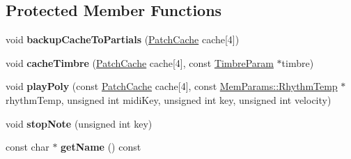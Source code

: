 \subsection*{Protected Member Functions}
\begin{DoxyCompactItemize}
\item 
\hypertarget{classMT32Emu_1_1Part_a05640c2c188b9513972c9a4625a33057}{void {\bfseries backup\-Cache\-To\-Partials} (\hyperlink{structMT32Emu_1_1PatchCache}{Patch\-Cache} cache\mbox{[}4\mbox{]})}\label{classMT32Emu_1_1Part_a05640c2c188b9513972c9a4625a33057}

\item 
\hypertarget{classMT32Emu_1_1Part_a021cac28939327fdc9042268dd457ecb}{void {\bfseries cache\-Timbre} (\hyperlink{structMT32Emu_1_1PatchCache}{Patch\-Cache} cache\mbox{[}4\mbox{]}, const \hyperlink{structMT32Emu_1_1TimbreParam}{Timbre\-Param} $\ast$timbre)}\label{classMT32Emu_1_1Part_a021cac28939327fdc9042268dd457ecb}

\item 
\hypertarget{classMT32Emu_1_1Part_a82799d0b4098649ad260f7a40a517cf3}{void {\bfseries play\-Poly} (const \hyperlink{structMT32Emu_1_1PatchCache}{Patch\-Cache} cache\mbox{[}4\mbox{]}, const \hyperlink{structMT32Emu_1_1MemParams_1_1RhythmTemp}{Mem\-Params\-::\-Rhythm\-Temp} $\ast$rhythm\-Temp, unsigned int midi\-Key, unsigned int key, unsigned int velocity)}\label{classMT32Emu_1_1Part_a82799d0b4098649ad260f7a40a517cf3}

\item 
\hypertarget{classMT32Emu_1_1Part_ade360ad50edafb4371ac983ed5b3865a}{void {\bfseries stop\-Note} (unsigned int key)}\label{classMT32Emu_1_1Part_ade360ad50edafb4371ac983ed5b3865a}

\item 
\hypertarget{classMT32Emu_1_1Part_a4f9b828ec9cacbdcf535d674b344dfb2}{const char $\ast$ {\bfseries get\-Name} () const }\label{classMT32Emu_1_1Part_a4f9b828ec9cacbdcf535d674b344dfb2}

\end{DoxyCompactItemize}
